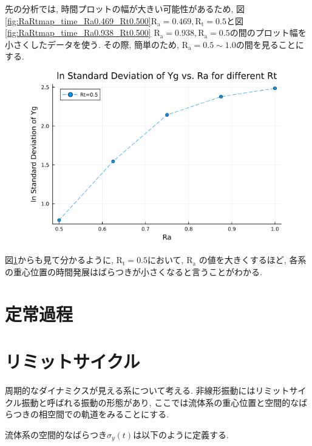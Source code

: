 先の分析では, 時間プロットの幅が大きい可能性があるため, 図\ref{fig:RaRtmap_time_Ra0.469_Rt0.500}$\text{R}_\text{a} = 0.469, \text{R}_\text{t} = 0.5$と図\ref{fig:RaRtmap_time_Ra0.938_Rt0.500} $\text{R}_\text{a} = 0.938, \text{R}_\text{a} = 0.5$の間のプロット幅を小さくしたデータを使う. その際, 簡単のため, $\text{R}_\text{a} =0.5 \sim 1.0$の間を見ることにする.



\begin{figure}[H]
  \centering
  \includegraphics[scale=0.5]{image/lnStdYg_Ra0.5to1.0_Rt0.5_ti25000.png}
  \caption{}
  \label{fig:lnStdYg_Ra0.5to1.0_Rt0.5_ti25000}
\end{figure}

図\ref{fig:lnStdYg_Ra0.5to1.0_Rt0.5_ti25000}からも見て分かるように, $\text{R}_\text{t} = 0.5$において, $\text{R}_\text{a}$ の値を大きくするほど, 各系の重心位置の時間発展はばらつきが小さくなると言うことがわかる.


\section{定常過程}


\section{リミットサイクル}

周期的なダイナミクスが見える系について考える. 非線形振動にはリミットサイクル振動\cite{Rhythm}と呼ばれる振動の形態があり, ここでは流体系の重心位置と空間的なばらつきの相空間での軌道をみることにする.

流体系の空間的なばらつき$\sigma_{y} (t)$は以下のように定義する.

